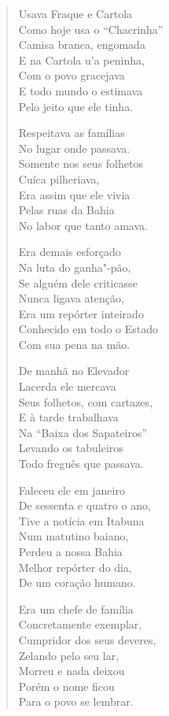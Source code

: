 \begin{verse}
Usava Fraque e Cartola \\
Como hoje usa o ``Chacrinha'' \\
Camisa branca, engomada \\
E na Cartola u'a peninha, \\
Com o povo gracejava \\
E todo mundo o estimava \\
Pelo jeito que ele tinha. 

Respeitava as famílias \\
No lugar onde passava. \\
Somente nos seus folhetos \\
Cuíca pilheriava, \\
Era assim que ele vivia \\
Pelas ruas da Bahia \\
No labor que tanto amava. 

Era demais esforçado \\
Na luta do ganha"-pão, \\
Se alguém dele criticasse \\
Nunca ligava atenção, \\
Era um repórter inteirado \\
Conhecido em todo o Estado \\
Com sua pena na mão. 


De manhã no Elevador \\
Lacerda ele mercava \\
Seus folhetos, com cartazes, \\
E à tarde trabalhava \\
Na ``Baixa dos Sapateiros'' \\
Levando os tabuleiros \\
Todo freguês que passava. 

Faleceu ele em janeiro \\
De sessenta e quatro o ano, \\
Tive a notícia em Itabuna \\
Num matutino baiano, \\
Perdeu a nossa Bahia \\
Melhor repórter do dia, \\
De um coração humano. 

Era um chefe de família \\
Concretamente exemplar, \\
Cumpridor dos seus deveres, \\
Zelando pelo seu lar, \\
Morreu e nada deixou \\
Porém o nome ficou \\
Para o povo se lembrar. 


\end{verse}

